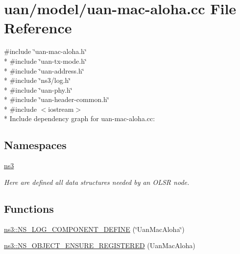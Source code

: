 \hypertarget{uan-mac-aloha_8cc}{}\section{uan/model/uan-\/mac-\/aloha.cc File Reference}
\label{uan-mac-aloha_8cc}
{\ttfamily \#include \char`\"{}uan-\/mac-\/aloha.\+h\char`\"{}}\\*
{\ttfamily \#include \char`\"{}uan-\/tx-\/mode.\+h\char`\"{}}\\*
{\ttfamily \#include \char`\"{}uan-\/address.\+h\char`\"{}}\\*
{\ttfamily \#include \char`\"{}ns3/log.\+h\char`\"{}}\\*
{\ttfamily \#include \char`\"{}uan-\/phy.\+h\char`\"{}}\\*
{\ttfamily \#include \char`\"{}uan-\/header-\/common.\+h\char`\"{}}\\*
{\ttfamily \#include $<$iostream$>$}\\*
Include dependency graph for uan-\/mac-\/aloha.cc\+:
\subsection*{Namespaces}
\begin{DoxyCompactItemize}
\item 
 \hyperlink{namespacens3}{ns3}
\begin{DoxyCompactList}\small\item\em Here are defined all data structures needed by an O\+L\+SR node. \end{DoxyCompactList}\end{DoxyCompactItemize}
\subsection*{Functions}
\begin{DoxyCompactItemize}
\item 
\hyperlink{namespacens3_a95bac00d628168bb588e77a2042991a3}{ns3\+::\+N\+S\+\_\+\+L\+O\+G\+\_\+\+C\+O\+M\+P\+O\+N\+E\+N\+T\+\_\+\+D\+E\+F\+I\+NE} (\char`\"{}Uan\+Mac\+Aloha\char`\"{})
\item 
\hyperlink{namespacens3_ab4c6904ca1adb8d0ad0d5e8ee0e51bf2}{ns3\+::\+N\+S\+\_\+\+O\+B\+J\+E\+C\+T\+\_\+\+E\+N\+S\+U\+R\+E\+\_\+\+R\+E\+G\+I\+S\+T\+E\+R\+ED} (Uan\+Mac\+Aloha)
\end{DoxyCompactItemize}
